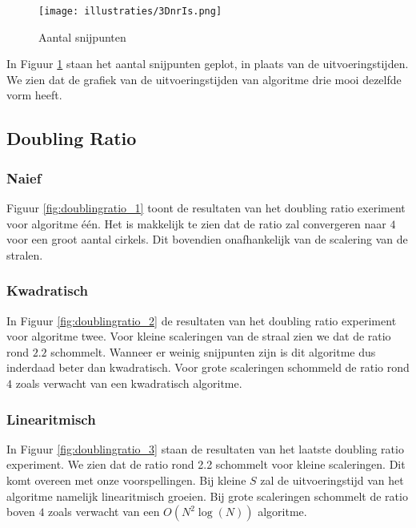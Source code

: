 \begin{figure}[H]
   	\centering
   	\texttt{[image: illustraties/3DnrIs.png]}
  	\label{fig:nr_intersections}
  	\caption{Aantal snijpunten}
\end{figure}

In Figuur \ref{fig:nr_intersections} staan het aantal snijpunten geplot, in plaats van de uitvoeringstijden. We zien dat de grafiek van de uitvoeringstijden van algoritme drie mooi dezelfde vorm heeft.

\subsection{Doubling Ratio}
\subsubsection{Naief}
\begin{table}[H]

\label{fig:doublingratio_1}
\caption{Doubling ratio 1}
\end{table}
Figuur \ref{fig:doublingratio_1} toont de resultaten van het doubling ratio exeriment voor algoritme \'e\'en. Het is makkelijk te zien dat de ratio zal convergeren naar $4$ voor een groot aantal cirkels. Dit bovendien onafhankelijk van de scalering van de stralen.

\subsubsection{Kwadratisch}
\begin{table}[H]

\label{fig:doublingratio_2}
\caption{Doubling ratio 2}
\end{table}
In Figuur \ref{fig:doublingratio_2} de resultaten van het doubling ratio experiment voor algoritme twee. Voor kleine scaleringen van de straal zien we dat de ratio rond $2.2$ schommelt. Wanneer er weinig snijpunten zijn is dit algoritme dus inderdaad beter dan kwadratisch.
Voor grote scaleringen schommeld de ratio rond $4$ zoals verwacht van een kwadratisch algoritme.

\subsubsection{Linearitmisch}
\begin{table}[h]

\label{fig:doublingratio_3}
\caption{Doubling ratio 3}
\end{table}
In Figuur \ref{fig:doublingratio_3} staan de resultaten van het laatste doubling ratio experiment.
We zien dat de ratio rond 2.2 schommelt voor kleine scaleringen.
Dit komt overeen met onze voorspellingen.
Bij kleine $S$ zal de uitvoeringstijd van het algoritme namelijk linearitmisch groeien.
Bij grote scaleringen schommelt de ratio boven $4$ zoals verwacht van een $O(N^2\log(N))$ algoritme.

